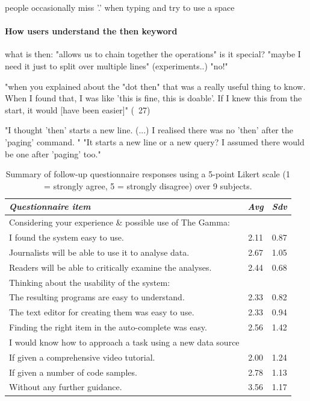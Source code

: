 \documentclass{sigchi}
\begin{document}
people occasionally miss '.' when typing and try to use a space

\paragraph{How users understand the then keyword}

what is then: "allows us to chain together the operations"
is it special? "maybe I need it just to split over multiple lines" (experiments..) "no!"

"when you explained about the "dot then" that was a really useful thing to know. When I found that, I was like 'this is fine, this is doable'. If I knew this from the start, it would [have been easier]" (~27)

"I thought 'then' starts a new line. (...) I realised there was no 'then' after the 'paging' command. "
"It starts a new line or a new query? I assumed there would be one after 'paging' too."

\begin{table}
  \centering
  \begin{tabular}{p{19em} c c}
    \toprule
      {\small \textit{Questionnaire item}} & {\small \textit{Avg}} & {\small \textit{Sdv}} \\
    \midrule
    \small Considering your experience \& possible use of The Gamma:\\
    \small \quad I found the system easy to use. & \small 2.11 & \small 0.87\\
    \small \quad Journalists will be able to use it to analyse data. & \small 2.67 & \small 1.05\\
    \small \quad Readers will be able to critically examine the analyses. & \small 2.44 & \small 0.68\\
    \small Thinking about the usability of the system:\\
    \small \quad The resulting programs are easy to understand. & \small 2.33 & \small 0.82\\
    \small \quad The text editor for creating them was easy to use. & \small 2.33 & \small 0.94\\
    \small \quad Finding the right item in the auto-complete was easy. & \small 2.56 & \small 1.42\\
    \small I would know how to approach a task using a new data source\\
    \small \quad If given a comprehensive video tutorial. & \small 2.00 & \small 1.24\\
    \small \quad If given a number of code samples. & \small 2.78 & \small 1.13\\
    \small \quad Without any further guidance. & \small 3.56 & \small 1.17\\
    \bottomrule
  \end{tabular}
  \caption{Summary of follow-up questionnaire responses using
    a 5-point Likert scale (1 = strongly agree, 5 = strongly disagree) over 9 subjects.}
  \label{tab:quest}
\end{table}
\end{document}
